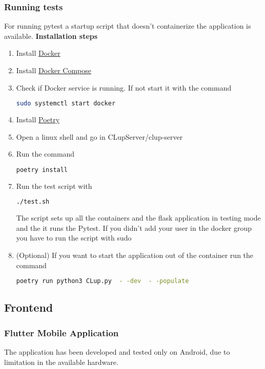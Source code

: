 \subsubsection{Running tests}
For running pytest a startup script that doesn't containerize the application is available.
\textbf{Installation steps}
\begin{enumerate}
    \item Install \href{https://docs.docker.com/get-docker/}{Docker}
    \item Install \href{https://docs.docker.com/compose/install/}{Docker Compose}
    \item Check if Docker service is running. If not start it with the command
          \begin{lstlisting}[language=bash]
    sudo systemctl start docker
    \end{lstlisting}
    \item Install \href{https://python-poetry.org/}{Poetry}
    \item Open a linux shell and go in CLupServer/clup-server
    \item Run the command
          \begin{lstlisting}[language=bash]
    poetry install
    \end{lstlisting}
    \item Run the test script with
          \begin{lstlisting}[language=bash]
    ./test.sh
    \end{lstlisting}
          The script sets up all the containers and the flask application in testing mode and the it runs the Pytest.
          If you didn't add your user in the docker group
          you have to run the script with sudo
    \item (Optional) If you want to start the application out of the container run the command
          \begin{lstlisting}[language=bash]
    poetry run python3 CLup.py  - -dev  - -populate
    \end{lstlisting}
\end{enumerate}

\clearpage

\subsection{Frontend}

\subsubsection{Flutter Mobile Application}
The application has been developed and tested only on Android, due to limitation in the available hardware.

